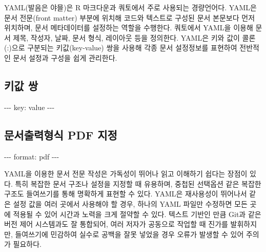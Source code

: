 \documentclass[
  letterpaper,
]{book}
\newenvironment{Shaded}{\begin{snugshade}}{\end{snugshade}}
\newcommand{\AttributeTok}[1]{\textcolor[rgb]{0.40,0.45,0.13}{#1}}
\newcommand{\FunctionTok}[1]{\textcolor[rgb]{0.28,0.35,0.67}{#1}}
\newcommand{\KeywordTok}[1]{\textcolor[rgb]{0.00,0.23,0.31}{#1}}
\newcommand{\PreprocessorTok}[1]{\textcolor[rgb]{0.68,0.00,0.00}{#1}}
\begin{document}
YAML(발음은 야믈)은 R 마크다운과 쿼토에서 주로 사용되는 경량언어다.
YAML은 문서 전문(front matter) 부분에 위치해 코드와 텍스트로 구성된 문서
본문보다 먼저 위치하며, 문서 메타데이터를 설정하는 역할을 수행한다.
쿼토에서 YAML을 이용해 문서 제목, 작성자, 날짜, 문서 형식, 레이아웃 등을
정의한다. YAML은 키와 값이 콜론(:)으로 구분되는 키값(key-value) 쌍을
사용해 각종 문서 설정정보를 표현하여 전반적인 문서 설정과 구성을 쉽게
관리한다.

\hypertarget{uxd0a4uxac12-uxc30d}{%
\subsection*{키값 쌍}\label{uxd0a4uxac12-uxc30d}}

\begin{Shaded}
\begin{Highlighting}[]
\PreprocessorTok{{-}{-}{-}}
\FunctionTok{key}\KeywordTok{:}\AttributeTok{ value}
\PreprocessorTok{{-}{-}{-}}
\end{Highlighting}
\end{Shaded}

\hypertarget{uxbb38uxc11cuxcd9cuxb825uxd615uxc2dd-pdf-uxc9c0uxc815}{%
\subsection*{문서출력형식 PDF
지정}\label{uxbb38uxc11cuxcd9cuxb825uxd615uxc2dd-pdf-uxc9c0uxc815}}

\begin{Shaded}
\begin{Highlighting}[]
\PreprocessorTok{{-}{-}{-}}
\FunctionTok{format}\KeywordTok{:}\AttributeTok{ pdf}
\PreprocessorTok{{-}{-}{-}}
\end{Highlighting}
\end{Shaded}

YAML을 이용한 문서 전문 작성은 가독성이 뛰어나 읽고 이해하기 쉽다는
장점이 있다. 특히 복잡한 문서 구조나 설정을 지정할 때 유용하며, 중첩된
선택옵션 같은 복잡한 구조도 들여쓰기를 통해 명확하게 표현할 수 있다.
YAML은 재사용성이 뛰어나서 같은 설정 값을 여러 곳에서 사용해야 할 경우,
하나의 YAML 파일만 수정하면 모든 곳에 적용될 수 있어 시간과 노력을 크게
절약할 수 있다. 텍스트 기반인 만큼 Git과 같은 버전 제어 시스템과도 잘
통합되어, 여러 저자가 공동으로 작업할 때 진가를 발휘하지만, 들여쓰기에
민감하여 실수로 공백을 잘못 넣었을 경우 오류가 발생할 수 있어 주의가
필요하다.
\end{document}
